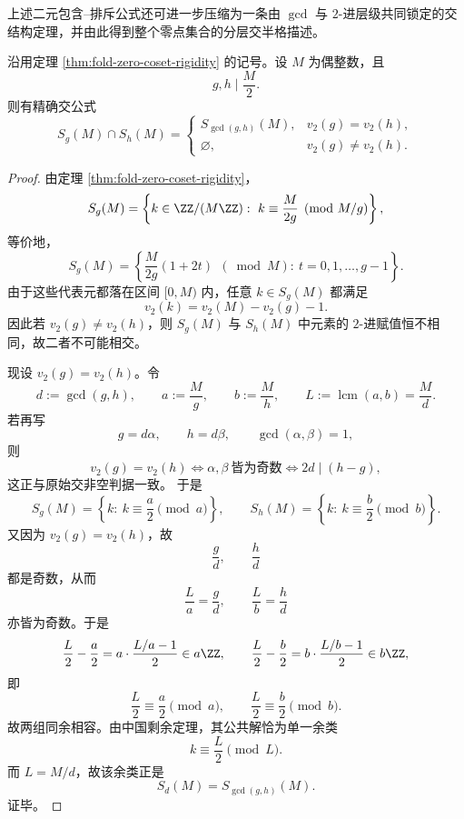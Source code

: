 上述二元包含--排斥公式还可进一步压缩为一条由 \(\gcd\) 与 \(2\)-进层级共同锁定的交结构定理，并由此得到整个零点集合的分层交半格描述。

\begin{theorem}\label{thm:xi-fold-zero-coset-v2-intersection-rigidity}
沿用定理 \ref{thm:fold-zero-coset-rigidity} 的记号。设 \(M\) 为偶整数，且
\[
g,h\mid \frac{M}{2}.
\]
则有精确交公式
\[
\boxed{\;
S_g(M)\cap S_h(M)=
\begin{cases}
S_{\gcd(g,h)}(M),& v_2(g)=v_2(h),\\[2mm]
\varnothing,& v_2(g)\neq v_2(h).
\end{cases}\;}
\]
\end{theorem}
\begin{proof}
由定理 \ref{thm:fold-zero-coset-rigidity}，
\[
S_g(M)=\left\{k\in \ZZ/(M\ZZ):\ k\equiv \frac{M}{2g}\pmod{M/g}\right\},
\]
等价地，
\[
S_g(M)=\left\{\frac{M}{2g}(1+2t)\ \ (\bmod M):\ t=0,1,\dots,g-1\right\}.
\]
由于这些代表元都落在区间 \([0,M)\) 内，任意 \(k\in S_g(M)\) 都满足
\[
v_2(k)=v_2(M)-v_2(g)-1.
\]
因此若 \(v_2(g)\neq v_2(h)\)，则 \(S_g(M)\) 与 \(S_h(M)\) 中元素的 \(2\)-进赋值恒不相同，故二者不可能相交。

现设 \(v_2(g)=v_2(h)\)。令
\[
d:=\gcd(g,h),\qquad a:=\frac{M}{g},\qquad b:=\frac{M}{h},\qquad L:=\operatorname{lcm}(a,b)=\frac{M}{d}.
\]
若再写
\[
g=d\alpha,\qquad h=d\beta,\qquad \gcd(\alpha,\beta)=1,
\]
则
\[
v_2(g)=v_2(h)
\iff
\alpha,\beta\ \text{皆为奇数}
\iff
2d\mid (h-g),
\]
这正与原始交非空判据一致。
于是
\[
S_g(M)=\left\{k:\ k\equiv \frac{a}{2}\pmod a\right\},
\qquad
S_h(M)=\left\{k:\ k\equiv \frac{b}{2}\pmod b\right\}.
\]
又因为 \(v_2(g)=v_2(h)\)，故
\[
\frac{g}{d},\qquad \frac{h}{d}
\]
都是奇数，从而
\[
\frac{L}{a}=\frac{g}{d},
\qquad
\frac{L}{b}=\frac{h}{d}
\]
亦皆为奇数。于是
\[
\frac{L}{2}-\frac{a}{2}
=
a\cdot \frac{L/a-1}{2}\in a\ZZ,
\qquad
\frac{L}{2}-\frac{b}{2}
=
b\cdot \frac{L/b-1}{2}\in b\ZZ,
\]
即
\[
\frac{L}{2}\equiv \frac{a}{2}\pmod a,
\qquad
\frac{L}{2}\equiv \frac{b}{2}\pmod b.
\]
故两组同余相容。由中国剩余定理，其公共解恰为单一余类
\[
k\equiv \frac{L}{2}\pmod L.
\]
而 \(L=M/d\)，故该余类正是
\[
S_d(M)=S_{\gcd(g,h)}(M).
\]
证毕。
\end{proof}

